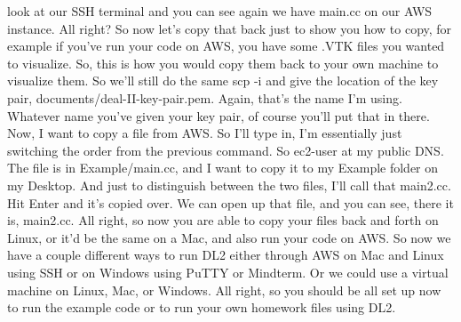 \documentclass[10pt]{article}
\begin{document}
look at our SSH terminal and you can see again we have main.cc on our AWS instance. All right? So now let's copy that back just to show you how to copy, for example if you've run your code on AWS, you have some .VTK files you wanted to visualize. So, this is how you would copy them back to your own machine to visualize them. So we'll still do the same scp -i and give the location of the key pair, documents/deal-II-key-pair.pem. Again, that's the name I'm using. Whatever name you've given your key pair, of course you'll put that in there. Now, I want to copy a file from AWS. So I'll type in, I'm essentially just switching the order from the previous command. So ec2-user at my public DNS. The file is in Example/main.cc, and I want to copy it to my Example folder on my Desktop. And just to distinguish between the two files, I'll call that main2.cc. Hit Enter and it's copied over. We can open up that file, and you can see, there it is, main2.cc. All right, so now you are able to copy your files back and forth on Linux, or it'd be the same on a Mac, and also run your code on AWS. So now we have a couple different ways to run DL2 either through AWS on Mac and Linux using SSH or on Windows using PuTTY or Mindterm. Or we could use a virtual machine on Linux, Mac, or Windows. All right, so you should be all set up now to run the example code or to run your own homework files using DL2.
\end{document}
